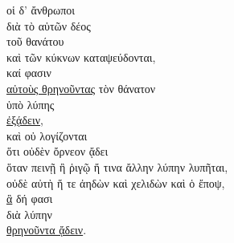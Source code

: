 {\large
\noindent οἱ δ' ἄνθρωποι \\
\tabto{2em} διὰ τὸ αὑτῶν δέος \\
\tabto{4em} τοῦ θανάτου \\
καὶ τῶν κύκνων καταψεύδονται, \\
καί φασιν \\
\tabto{2em} \underline{αὐτοὺς θρηνοῦντας} τὸν θάνατον \\
\tabto{4em} ὑπὸ λύπης \\
\tabto{2em} \underline{ἐξᾴδειν}, \\
καὶ οὐ λογίζονται \\
\tabto{2em} ὅτι οὐδὲν ὄρνεον ᾄδει \\
\tabto{4em} ὅταν πεινῇ ἢ ῥιγῷ ἤ τινα ἄλλην λύπην λυπῆται, \\
\tabto{2em} οὐδὲ αὐτὴ ἥ τε ἀηδὼν καὶ χελιδὼν καὶ ὁ ἔποψ, \\
\tabto{4em} \underline{ἃ} δή φασι \\
\tabto{6em} διὰ λύπην \\
\tabto{4em} \underline{θρηνοῦντα ᾄδειν}.\\

}

